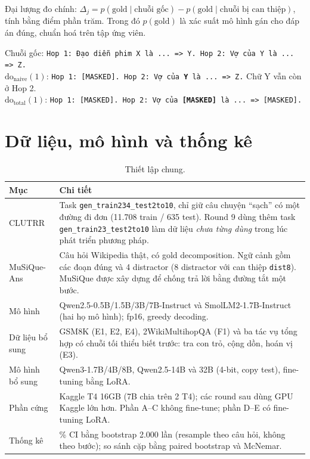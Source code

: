 \documentclass[11pt]{article}
\newcommand{\dn}{\mathrm{do}_{\text{naive}}}
\newcommand{\dt}{\mathrm{do}_{\text{total}}}
\begin{document}
Đại lượng đo chính: $\Delta_j = p(\text{gold}\mid\text{chuỗi gốc}) - p(\text{gold}\mid
\text{chuỗi bị can thiệp})$, tính bằng điểm phần trăm. Trong đó $p(\text{gold})$ là xác suất mô hình
gán cho đáp án đúng, chuẩn hoá trên tập ứng viên.

\begin{vidu}
Chuỗi gốc: \texttt{Hop 1: Đạo diễn phim X là ... => Y. Hop 2: Vợ của Y là ... => Z.}\\
$\dn(1)$: \texttt{Hop 1: [MASKED]. Hop 2: Vợ của \textbf{Y} là ... => Z.} Chữ Y vẫn còn ở Hop 2.\\
$\dt(1)$: \texttt{Hop 1: [MASKED]. Hop 2: Vợ của \textbf{[MASKED]} là ... => [MASKED].}
\end{vidu}

\section{Dữ liệu, mô hình và thống kê}

\begin{table}[h]
\centering\small
\caption{Thiết lập chung.}
\begin{tabularx}{\linewidth}{@{}l>{\raggedright\arraybackslash}X@{}}
\toprule
Mục & Chi tiết \\
\midrule
CLUTRR & Task \texttt{gen\_train234\_test2to10}, chỉ giữ câu chuyện ``sạch'' có một đường đi đơn
  (11.708 train / 635 test). Round 9 dùng thêm task \texttt{gen\_train23\_test2to10} làm dữ liệu
  \emph{chưa từng dùng} trong lúc phát triển phương pháp. \\
MuSiQue-Ans & Câu hỏi Wikipedia thật, có gold decomposition. Ngữ cảnh gồm các đoạn đúng và 4
  distractor (8 distractor với can thiệp \texttt{dist8}). MuSiQue được xây dựng để chống trả lời
  bằng đường tắt một bước. \\
Mô hình & Qwen2.5-0.5B/1.5B/3B/7B-Instruct và SmolLM2-1.7B-Instruct (hai họ mô hình); fp16,
  greedy decoding. \\
Dữ liệu bổ sung & GSM8K (E1, E2, E4), 2WikiMultihopQA (F1) và ba tác vụ tổng hợp có chuỗi tối thiểu biết
  trước: tra con trỏ, cộng dồn, hoán vị (E3). \\
Mô hình bổ sung & Qwen3-1.7B/4B/8B, Qwen2.5-14B và 32B (4-bit, copy test), fine-tuning bằng LoRA. \\
Phần cứng & Kaggle T4 16GB (7B chia trên 2 T4); các round sau dùng GPU Kaggle lớn hơn. Phần A--C không
  fine-tune; phần D--E có fine-tuning LoRA. \\
Thống kê & 95\% CI bằng bootstrap 2.000 lần (resample theo câu hỏi, không theo bước); so sánh cặp
  bằng paired bootstrap và McNemar. \\
\bottomrule
\end{tabularx}
\end{table}
\end{document}
